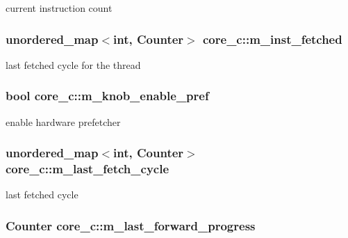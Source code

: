 \label{classcore__c_a4a92fed13bf3f6becb873ce1921acb4a}
current instruction count \hypertarget{classcore__c_a113eb7ebc1c43c6b111a83d5fe791f75}{
\subsubsection[{m\_\-inst\_\-fetched}]{\setlength{\rightskip}{0pt plus 5cm}unordered\_\-map$<$int, Counter$>$ {\bf core\_\-c::m\_\-inst\_\-fetched}}}
\label{classcore__c_a113eb7ebc1c43c6b111a83d5fe791f75}
last fetched cycle for the thread \hypertarget{classcore__c_a8f3b1efc800f1e8967c8e406562069e3}{
\subsubsection[{m\_\-knob\_\-enable\_\-pref}]{\setlength{\rightskip}{0pt plus 5cm}bool {\bf core\_\-c::m\_\-knob\_\-enable\_\-pref}}}
\label{classcore__c_a8f3b1efc800f1e8967c8e406562069e3}
enable hardware prefetcher \hypertarget{classcore__c_a885c62130d2062aa971cee4d6c1169b9}{
\subsubsection[{m\_\-last\_\-fetch\_\-cycle}]{\setlength{\rightskip}{0pt plus 5cm}unordered\_\-map$<$int, Counter$>$ {\bf core\_\-c::m\_\-last\_\-fetch\_\-cycle}}}
\label{classcore__c_a885c62130d2062aa971cee4d6c1169b9}
last fetched cycle \hypertarget{classcore__c_aaeba580eada653812b7550c7805891cb}{
\subsubsection[{m\_\-last\_\-forward\_\-progress}]{\setlength{\rightskip}{0pt plus 5cm}Counter {\bf core\_\-c::m\_\-last\_\-forward\_\-progress}}}
